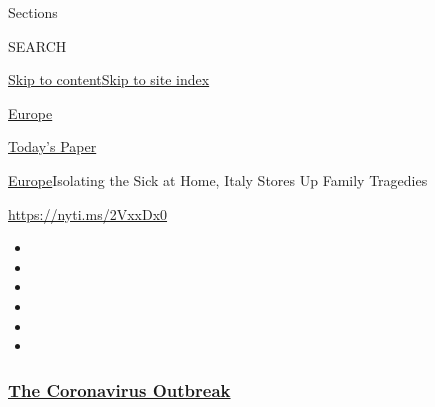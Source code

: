 Sections

SEARCH

\protect\hyperlink{site-content}{Skip to
content}\protect\hyperlink{site-index}{Skip to site index}

\href{https://www.nytimes3xbfgragh.onion/section/world/europe}{Europe}

\href{https://myaccount.nytimes3xbfgragh.onion/auth/login?response_type=cookie\&client_id=vi}{}

\href{https://www.nytimes3xbfgragh.onion/section/todayspaper}{Today's
Paper}

\href{/section/world/europe}{Europe}\textbar{}Isolating the Sick at
Home, Italy Stores Up Family Tragedies

\url{https://nyti.ms/2VxxDx0}

\begin{itemize}
\item
\item
\item
\item
\item
\item
\end{itemize}

\hypertarget{the-coronavirus-outbreak}{%
\subsubsection{\texorpdfstring{\href{https://www.nytimes3xbfgragh.onion/news-event/coronavirus?name=styln-coronavirus-national\&region=TOP_BANNER\&block=storyline_menu_recirc\&action=click\&pgtype=Article\&impression_id=f59e4fd0-efba-11ea-943d-2f0afe93ad3a\&variant=undefined}{The
Coronavirus
Outbreak}}{The Coronavirus Outbreak}}\label{the-coronavirus-outbreak}}


